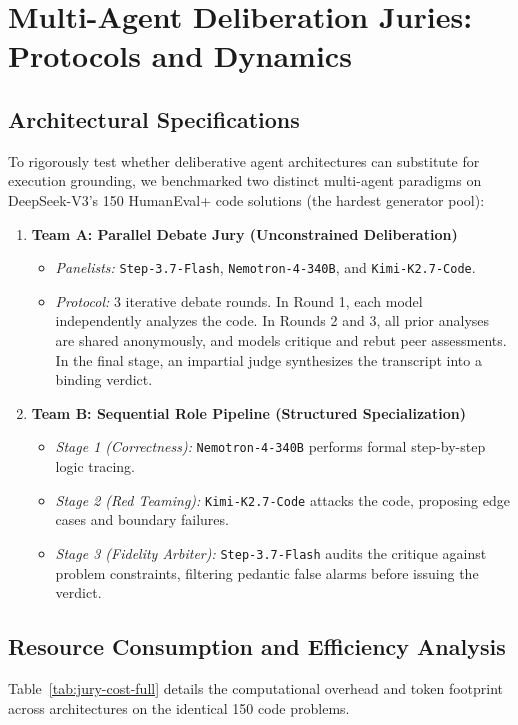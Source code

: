 \section{Multi-Agent Deliberation Juries: Protocols and Dynamics}
\label{app:jury}

\subsection{Architectural Specifications}
To rigorously test whether deliberative agent architectures can substitute for execution grounding, we benchmarked two distinct multi-agent paradigms on DeepSeek-V3's 150 HumanEval+ code solutions (the hardest generator pool):

\begin{enumerate}[leftmargin=*]
  \item \textbf{Team A: Parallel Debate Jury (Unconstrained Deliberation)}
    \begin{itemize}[nosep]
      \item \textit{Panelists:} \texttt{Step-3.7-Flash}, \texttt{Nemotron-4-340B}, and \texttt{Kimi-K2.7-Code}.
      \item \textit{Protocol:} 3 iterative debate rounds. In Round 1, each model independently analyzes the code. In Rounds 2 and 3, all prior analyses are shared anonymously, and models critique and rebut peer assessments. In the final stage, an impartial judge synthesizes the transcript into a binding verdict.
    \end{itemize}
  \item \textbf{Team B: Sequential Role Pipeline (Structured Specialization)}
    \begin{itemize}[nosep]
      \item \textit{Stage 1 (Correctness):} \texttt{Nemotron-4-340B} performs formal step-by-step logic tracing.
      \item \textit{Stage 2 (Red Teaming):} \texttt{Kimi-K2.7-Code} attacks the code, proposing edge cases and boundary failures.
      \item \textit{Stage 3 (Fidelity Arbiter):} \texttt{Step-3.7-Flash} audits the critique against problem constraints, filtering pedantic false alarms before issuing the verdict.
    \end{itemize}
\end{enumerate}

\subsection{Resource Consumption and Efficiency Analysis}
Table~\ref{tab:jury-cost-full} details the computational overhead and token footprint across architectures on the identical 150 code problems.

